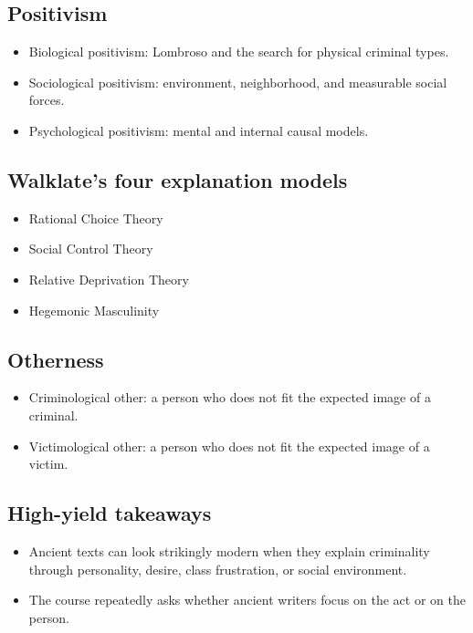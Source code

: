 \documentclass[11pt]{article}
\begin{document}
\subsection{Positivism}

\begin{itemize}
\item Biological positivism: Lombroso and the search for physical criminal types.
\item Sociological positivism: environment, neighborhood, and measurable social forces.
\item Psychological positivism: mental and internal causal models.
\end{itemize}

\subsection{Walklate's four explanation models}

\begin{itemize}
\item Rational Choice Theory
\item Social Control Theory
\item Relative Deprivation Theory
\item Hegemonic Masculinity
\end{itemize}

\subsection{Otherness}

\begin{itemize}
\item Criminological other: a person who does not fit the expected image of a criminal.
\item Victimological other: a person who does not fit the expected image of a victim.
\end{itemize}

\subsection{High-yield takeaways}

\begin{itemize}
\item Ancient texts can look strikingly modern when they explain criminality through personality, desire, class frustration, or social environment.
\item The course repeatedly asks whether ancient writers focus on the act or on the person.
\end{itemize}
\end{document}
